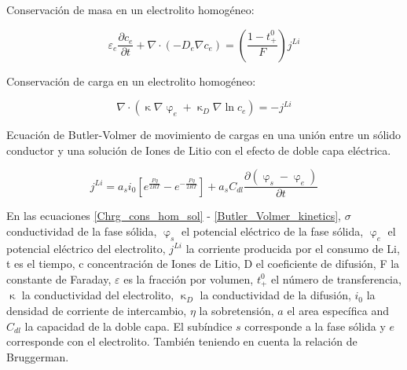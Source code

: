 \documentclass[10pt,a4paper]{article}
\begin{document}
	Conservación de masa en un electrolito homogéneo:\\
	
	\begin{figure}[h!]
		\begin{center}
			\begin{equation}
				\varepsilon_e\frac{\partial c_e}{\partial t} + \nabla \cdot (-D_e\nabla c_e) = (\frac{1-t_+^0}{F})j^{Li}
				\label{Mass_cons_hom_electrolyte}
			\end{equation}	
		\end{center}
	\end{figure}
	
	Conservación de carga en un electrolito homogéneo:\\
	
	\begin{figure}[h!]
		\begin{center}
			\begin{equation}
				\nabla \cdot (\upkappa \nabla \upvarphi_e + \upkappa_D \nabla \ln c_e) = -j^{Li}
				\label{Chrg_cons_hom_electrolyte}
			\end{equation}	
		\end{center}
	\end{figure}
	
	Ecuación de Butler-Volmer de movimiento de cargas en una unión entre un sólido conductor y una solución de Iones de Litio con el efecto de doble capa eléctrica. \\
	
	\begin{figure}[h!]
		\begin{center}
			\begin{equation}
				j^{Li} = a_si_0[{e^\frac{F\eta}{2RT}-e^{-\frac{F\eta}{2RT}}}]+ a_sC_{dl}\frac{\partial{(\upvarphi_s - \upvarphi_e)}}{\partial t}
				\label{Butler_Volmer_kinetics}
			\end{equation}	
		\end{center}
	\end{figure}
	
	En las ecuaciones \ref{Chrg_cons_hom_sol} - \ref{Butler_Volmer_kinetics}, $\sigma$  conductividad de la fase sólida, $\upvarphi_s$ el potencial eléctrico de la fase sólida, $\upvarphi_e$ el potencial eléctrico del electrolito, $j^{Li}$ la corriente producida por el consumo de Li, t es el tiempo, c concentración de Iones de Litio, D el coeficiente de difusión, F la constante de Faraday, $\varepsilon$ es la fracción por volumen,
	$t_+^0$ el número de transferencia, $\upkappa$ la conductividad del electrolito,
	$\upkappa_D$ la conductividad de la difusión, $i_0$ la densidad de corriente de intercambio, $\eta$ la sobretensión, $a$ el area específica and $C_{dl}$ la capacidad de la doble capa. El subíndice $s$ corresponde a la fase sólida y $e$ corresponde con el electrolito. También teniendo en cuenta la relación de Bruggerman.
	
\end{document}
